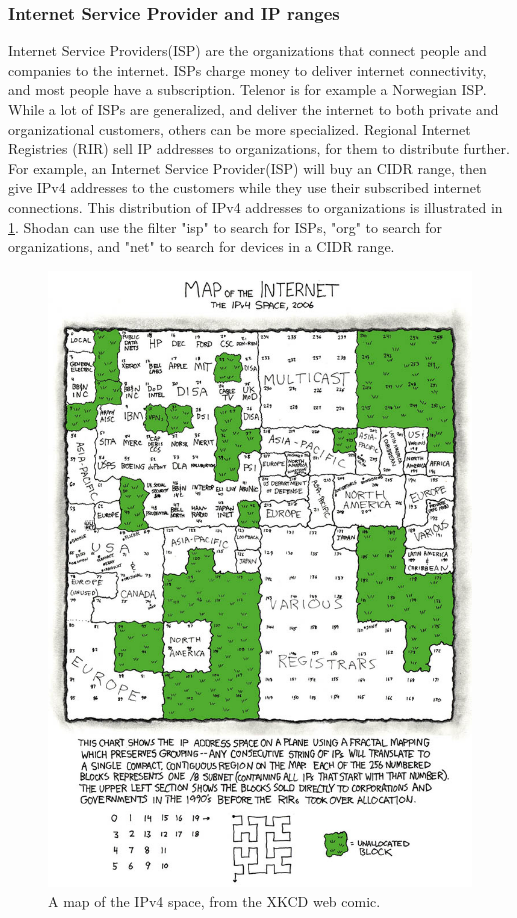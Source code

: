 \subsubsection{Internet Service Provider and IP ranges} \label{sec:isp_method}
Internet Service Providers(ISP) are the organizations that connect people and companies to the internet. ISPs charge money to deliver internet connectivity, and most people have a subscription. Telenor is for example a Norwegian ISP. While a lot of ISPs are generalized, and deliver the internet to both private and organizational customers, others can be more specialized. 
Regional Internet Registries (RIR) sell IP addresses to organizations, for them to distribute further. For example, an Internet Service Provider(ISP) will buy an CIDR range, then give IPv4 addresses to the customers while they use their subscribed internet connections. This distribution of IPv4 addresses to organizations is illustrated in \cref{fig:ipv4_map}. Shodan can use the filter "isp" to search for ISPs, "org" to search for organizations, and "net" to search for devices in a CIDR range. 

\begin{figure} [H]
    \centering
    \includegraphics[scale=4]{Figurer/map_of_the_internet.jpg}
    \caption{A map of the IPv4 space, from the XKCD web comic. \cite{xkcd} }
    \label{fig:ipv4_map}
\end{figure}

